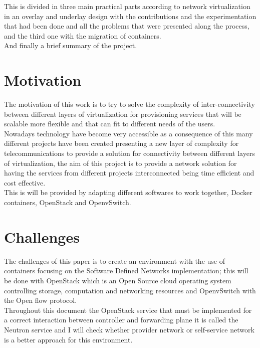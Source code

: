 This is divided in three main practical parts according to network virtualization in an overlay and underlay design with the contributions and the experimentation that had been done and all the problems that were presented along the process, and the third one with the migration of containers.\\
 
And finally a brief summary of the project.\\
 
\section{Motivation} 

The motivation of this work is to try to solve the complexity of inter-connectivity between different layers of virtualization for provisioning services that will be scalable more flexible and that can fit to different needs of the users.\\

Nowadays technology have become very accessible as a consequence of this many different projects have been created presenting a new layer of complexity for telecommunications to provide a solution for connectivity between different layers of virtualization, the aim of this project is to provide a network solution for having the services from different projects interconnected being time efficient and cost effective.\\

This is will be provided by adapting different softwares to work together, Docker containers, OpenStack and OpenvSwitch.\\


\section{Challenges}
 
The challenges of this paper is to create an environment with the use of containers focusing on the Software Defined Networks implementation; this will be done with OpenStack which is an Open Source cloud operating system controlling storage, computation and networking resources and OpenvSwitch with the Open flow protocol.\\

Throughout this document the OpenStack service that must be implemented for a correct interaction between controller and forwarding plane it is called the Neutron service and I will check whether provider network or self-service network is a better approach for this environment.\\

